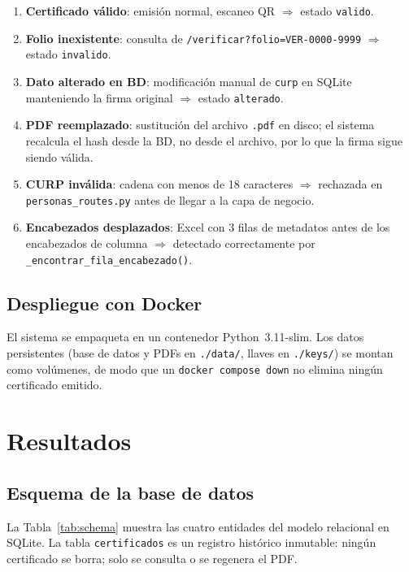 \documentclass[11pt,letterpaper]{article}
\begin{document}
\begin{enumerate}[label=\textbf{VT\arabic*.}]
  \item \textbf{Certificado v\'alido}: emisi\'on normal, escaneo QR
        $\Rightarrow$ estado \texttt{valido}.
  \item \textbf{Folio inexistente}: consulta de
        \texttt{/verificar?folio=VER-0000-9999}
        $\Rightarrow$ estado \texttt{invalido}.
  \item \textbf{Dato alterado en BD}: modificaci\'on manual de \texttt{curp}
        en SQLite manteniendo la firma original
        $\Rightarrow$ estado \texttt{alterado}.
  \item \textbf{PDF reemplazado}: sustituci\'on del archivo \texttt{.pdf}
        en disco; el sistema recalcula el hash desde la BD, no desde el archivo,
        por lo que la firma sigue siendo v\'alida.
  \item \textbf{CURP inv\'alida}: cadena con menos de 18 caracteres
        $\Rightarrow$ rechazada en \texttt{personas\_routes.py} antes de llegar
        a la capa de negocio.
  \item \textbf{Encabezados desplazados}: Excel con 3 filas de metadatos antes
        de los encabezados de columna $\Rightarrow$ detectado correctamente por
        \texttt{\_encontrar\_fila\_encabezado()}.
\end{enumerate}

\subsection{Despliegue con Docker}

El sistema se empaqueta en un contenedor Python~3.11-slim. Los datos persistentes
(base de datos y PDFs en \texttt{./data/}, llaves en \texttt{./keys/}) se montan
como vol\'umenes, de modo que un \texttt{docker compose down} no elimina ning\'un
certificado emitido.

\section{Resultados}

\subsection{Esquema de la base de datos}

La Tabla~\ref{tab:schema} muestra las cuatro entidades del modelo relacional en
SQLite. La tabla \texttt{certificados} es un registro hist\'orico inmutable:
ning\'un certificado se borra; solo se consulta o se regenera el PDF.
\end{document}
